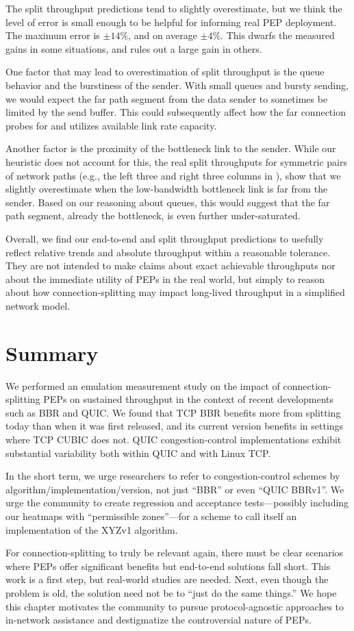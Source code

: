 The split throughput predictions tend to slightly overestimate, but we think
the level of error is small enough to be helpful for informing real PEP
deployment. The maximum error is $\pm14\%$, and on average $\pm4\%$. This
dwarfs the measured gains in some situations, and rules out a large gain in
others.

One factor that may lead to overestimation of split throughput is the queue
behavior and the burstiness of the sender. With small queues and bursty
sending, we would expect the far path segment from the data sender to sometimes
be limited by the send buffer. This could subsequently affect how the far
connection probes for and utilizes available link rate capacity.

Another factor is the proximity of the bottleneck link to the sender. While
our heuristic does not account for this, the real split throughputs for
symmetric pairs of network paths (e.g., the left three and right three columns
in ), show that we slightly overestimate
when the low-bandwidth bottleneck link is far from the sender.
Based on our reasoning about queues, this would suggest that the far path
segment, already the bottleneck, is even further under-saturated.

Overall, we find our end-to-end and split throughput predictions to usefully
reflect relative trends and absolute throughput within a
reasonable tolerance. They are not intended to make claims about exact achievable
throughputs nor about the immediate utility of PEPs in the real world,
but simply to reason about how connection-splitting may impact
long-lived throughput in a simplified network model.

\section{Summary}
\label{sec:splitting:summary}

We performed an emulation measurement study on the impact of
connection-splitting PEPs on sustained throughput in the context of recent
developments such as BBR and QUIC. We found that TCP BBR benefits more from
splitting today than when it was first released, and its current version
benefits in settings where TCP CUBIC does not. QUIC congestion-control
implementations exhibit substantial variability both within QUIC and with
Linux TCP.

In the short term, we urge researchers to refer to congestion-control schemes
by algorithm/implementation/version, not just ``BBR'' or even ``QUIC BBRv1''.
We urge the community to create regression and acceptance tests---possibly
including our heatmaps with ``permissible zones''---for a scheme to call
itself an implementation of the XYZv1 algorithm.

For connection-splitting to truly be relevant again, there must be clear
scenarios where PEPs offer significant benefits but end-to-end solutions fall
short. This work is a first step, but real-world studies are needed. Next,
even though the problem is old, the solution need not be to ``just do the same
things.'' We hope this chapter motivates the community to pursue
protocol-agnostic approaches to in-network assistance and destigmatize the
controversial nature of PEPs.

